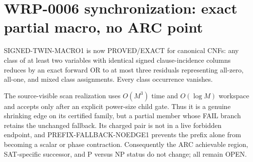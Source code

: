 \section{WRP-0006 synchronization: exact partial macro, no ARC point}

SIGNED-TWIN-MACRO1 is now PROVED/EXACT for canonical CNFs: any class of at
least two variables with identical signed clause-incidence columns reduces by
an exact forward OR to at most three residuals representing all-zero,
all-one, and mixed class assignments.  Every class occurrence vanishes.

The source-visible scan realization uses $O(M^3)$ time and $O(\log M)$
workspace and accepts only after an explicit power-size child gate.  Thus it
is a genuine shrinking edge on its certified family, but a partial member
whose FAIL branch retains the unchanged fallback.  Its charged pair is not
in a live forbidden endpoint, and PREFIX-FALLBACK-NOEDGE1 prevents the prefix
alone from becoming a scalar or phase contraction.  Consequently the ARC
achievable region, SAT-specific successor, and P versus NP status do not
change; all remain OPEN.
